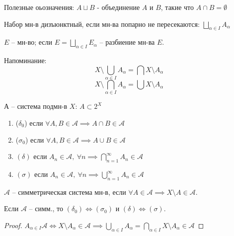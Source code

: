 Полезные оьозначения: $A \sqcup B$ - объединение $A$ и $B$, такие что $A \cap B = \emptyset$

\begin{definition}
    Набор мн-в дизъюнктный, если мн-ва попарно не пересекаются: $\bigsqcup_{\alpha \in I}A_{\alpha}$
\end{definition}

\begin{definition}
    $E$ -- мн-во; если $E = \bigsqcup_{\alpha \in I} E_{\alpha}$ -- разбиение мн-ва $E$.
\end{definition}

Напоминание:
$$X \setminus \bigcup_{\alpha \in I} A_{\alpha} = \bigcap X \setminus A_{\alpha}$$
$$X \setminus \bigcap_{\alpha \in I} A_{\alpha} = \bigcup X \setminus A_{\alpha}$$


\begin{definition}
    $\mathcal{А}$ -- система подмн-в $X$: $A \subset 2^{X}$

    \begin{enumerate}
        \item ($\delta_0$) если $\forall A, B \in \mathcal{A} \implies A \cap B \in \mathcal{A}$
        \item ($\sigma_0$) если $\forall A, B \in \mathcal{A} \implies A \cup B \in \mathcal{A}$
        \item {
            $(\delta)$ если $A_n \in \mathcal{A}, \ \forall n \implies \bigcap_{n=1}^{\infty} A_n \in \mathcal{A}$
        }
        \item {
            $(\sigma)$ если $A_n \in \mathcal{A}, \ \forall n \implies \bigcup_{n=1}^{\infty} A_n \in \mathcal{A}$
        }
    \end{enumerate}
\end{definition}

\begin{definition}
    $\mathcal{A}$ -- симметрическая система мн-в, если $\forall A \in \mathcal{A} \implies X \setminus A \in \mathcal{A}$.
\end{definition}

\begin{statement}
    Если $\mathcal{A}$ -- симм., то $(\delta_{0}) \Leftrightarrow (\sigma_{0})$ и $(\delta) \Leftrightarrow (\sigma)$.
\end{statement}

\begin{proof}
    $A_{\alpha \in I}\mathcal{A} \Leftrightarrow X \setminus A_{\alpha} \in \mathcal{A} \implies \bigcup_{\alpha \in I}A_{\alpha} = \bigcap_{\alpha \in I} X \setminus A_{\alpha} \in \mathcal{A}$
\end{proof}


